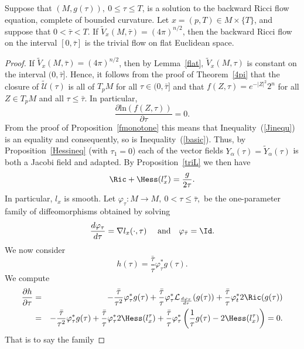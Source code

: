 \begin{proposition}
\label{prop:reduced-volume-rigidity}\label{4picase}
Suppose that $(M,g(\tau)),\ 0\le \tau\le T$,
 is a solution to the backward Ricci flow
equation, complete of bounded curvature. Let $x=(p,T)\in M\times
\{T\}$, and suppose that $0<\bar\tau<T$. If $\widetilde
V_x(M,\bar\tau)=(4\pi)^{n/2}$, then the backward Ricci flow on the
interval $[0,\bar\tau]$ is the trivial flow on flat Euclidean space.
\end{proposition}

\begin{proof}
If $\widetilde V_x(M,\bar\tau)=(4\pi)^{n/2}$, then by
Lemma~\ref{flat}, $\widetilde V_x(M,\tau)$ is constant on the
interval $(0,\bar\tau]$. Hence, it follows from the proof of
Theorem~\ref{4pi} that the closure of $\widetilde{\mathcal U}(\tau)$
is all of $T_pM$ for all $\tau\in (0,\bar\tau]$ and that
$f(Z,\tau)=e^{-|Z|^2}2^n$ for all $Z\in T_pM$ and all $\tau\le
\bar\tau$. In particular,
$$\frac{\partial \mathrm{ln}(f(Z,\tau))}{\partial \tau}=0.$$
From the proof of
 Proposition~\ref{fmonotone} this means that
Inequality~(\ref{Jinequ}) is an equality and consequently, so is
Inequality~(\ref{basic}). Thus, by Proposition~\ref{Hessineq}
 (with $\tau_1=0$) each of the vector fields $Y_\alpha(\tau)=\tilde
Y_\alpha(\tau)$ is both a Jacobi field and adapted. By
Proposition~\ref{triL} we then have
$$\Ric+\Hess(l^\tau_x)=\frac{g}{2\tau}.$$
In particular, $l_x$ is smooth. Let $\varphi_\tau\colon M\to M,\
0<\tau\le \bar\tau$,\ be the one-parameter family of diffeomorphisms
obtained by solving
$$\frac{d\varphi_\tau}{d\tau}=\nabla
l_x(\cdot,\tau)\ \ \ \ \mathrm{and} \ \ \ \varphi_{\bar\tau}=\Id.$$ We now consider
$$h(\tau)=\frac{\bar\tau}{\tau}\varphi_\tau^*g(\tau).$$
We compute \begin{eqnarray*}\frac{\partial h}{\partial \tau} & = &
-\frac{\bar\tau}{\tau^2}\varphi_\tau^*g(\tau)
+\frac{\bar\tau}{\tau}\varphi_\tau^*{\mathcal
L}_{\frac{d\varphi_\tau}{d\tau}}(g(\tau))
+\frac{\bar\tau}{\tau}\varphi_t^*2\Ric(g(\tau)) \\
& = & -\frac{\bar\tau}{\tau^2}\varphi_\tau^*g(\tau) +
\frac{\bar\tau}{\tau}\varphi_\tau^*2\Hess(l_x^\tau)+\frac{\bar\tau}{\tau}
\varphi_\tau^*\left(\frac{1}{\tau}g(\tau)-2\Hess(l_x^\tau)\right)=0.\end{eqnarray*} That is to say the family

\end{proof}
